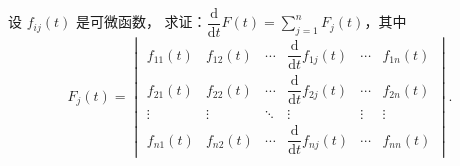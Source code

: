 \begin{example}{}{}
    设 $f_{ij}(t)$ 是可微函数，
    求证：$\dfrac{\mathrm{d}}{\mathrm{d}t}F(t)=\sum\limits_{j=1}^nF_j(t)$，其中
    \[F_j(t)=\begin{vmatrix}
            f_{11}(t) & f_{12}(t) & \cdots & \dfrac{\mathrm{d}}{\mathrm{d}t}f_{1j}(t) & \cdots & f_{1n}(t) \\[2ex]
            f_{21}(t) & f_{22}(t) & \cdots & \dfrac{\mathrm{d}}{\mathrm{d}t}f_{2j}(t) & \cdots & f_{2n}(t) \\[2ex]
            \vdots    & \vdots    & \ddots & \vdots                                   & \vdots & \vdots    \\[2ex]
            f_{n1}(t) & f_{n2}(t) & \cdots & \dfrac{\mathrm{d}}{\mathrm{d}t}f_{nj}(t) & \cdots & f_{nn}(t)
        \end{vmatrix}.\]
\end{example}

